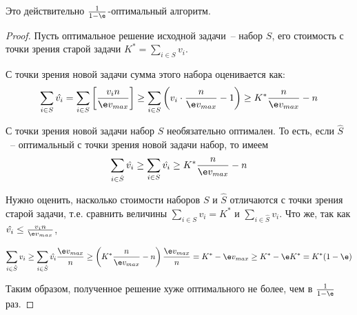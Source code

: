 \begin{theorem*}
    Это действительно $\frac{1}{1-\e}$-оптимальный алгоритм.
\end{theorem*}
\begin{proof}
Пусть оптимальное решение исходной задачи~-- набор $S$, его стоимость с точки зрения старой задачи $K^* = \sum\limits_{i\in S} v_i$.

С точки зрения новой задачи сумма этого набора оценивается как:
$$\sum_{i\in S}\hat{v_i} = \sum_{i\in S} \left[\frac{v_i n}{\e v_{max}}\right] \geq \sum_{i\in S} \left(v_i \cdot \frac{n}{\e v_{max}} - 1\right) \geq K^*\frac{n}{\e v_{max}} - n$$

С точки зрения новой задачи набор $S$ необязательно оптимален. То есть, если $\hat{S}$~-- оптимальный с точки зрения новой задачи набор, то имеем $$\sum_{i\in\hat S}\hat{v_i} \geq \sum_{i\in S} \hat{v_i} \geq K^*\frac{n}{\e v_{max}} - n$$

Нужно оценить, насколько стоимости наборов $S$ и $\hat S$ отличаются с точки зрения старой задачи, т.е. сравнить величины $\sum\limits_{i\in S}v_i = K^*$ и $\sum\limits_{i\in\hat S}v_i$. Что же, так как $\hat{v_i} \leq \frac{v_i n}{\e v_{max}}$,

$$\sum_{i\in\hat S}v_i \geq \sum_{i\in\hat S} \hat{v_i} \frac{\e v_{max}}{n} \geq \left(K^*\frac{n}{\e v_{max}} - n\right)\frac{\e v_{max}}{n} = K^* - \e v_{max} \geq K^* - \e K^* = K^*(1-\e)$$

Таким образом, полученное решение  хуже оптимального не более, чем в $\frac{1}{1-\e}$ раз. 
\end{proof}
